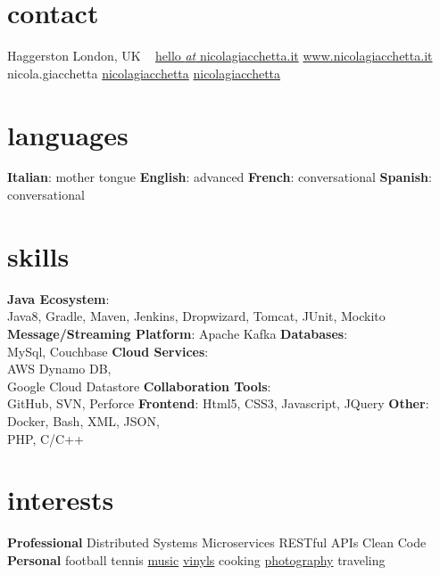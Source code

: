 
\newcommand*{\img}[1]{%
    \raisebox{-.1\baselineskip}{%
        \texttt{[image: \#1]}%
    }%
}



\begin{aside} %
\section{\normalfont contact}
\img{img_tube.png} Haggerston
London, UK
~
\myNumberUK
\href{mailto:\myEmail}{hello {\emph{at}} nicolagiacchetta.it}
\href{http://www.nicolagiacchetta.it/}{www.nicolagiacchetta.it}
\raisebox{-0.4ex}{\skype{}} nicola.giacchetta
 \hspace{0.02cm} \href{https://github.com/nicolagiacchetta}{ nicolagiacchetta}
 \hspace{0.02cm} \href{https://www.linkedin.com/in/nicolagiacchetta}{ nicolagiacchetta}
~
\vspace{-0.1cm}
\section{\normalfont languages}
\textbf{Italian}: mother tongue
\textbf{English}: advanced
\textbf{French}: conversational
\textbf{Spanish}: conversational
~
\vspace{-0.1cm}
\section{\normalfont skills}
\textbf{Java Ecosystem}:\\ Java8, Gradle, Maven, Jenkins, Dropwizard, Tomcat, JUnit, Mockito
\textbf{Message/Streaming Platform}: Apache Kafka
\textbf{Databases}:\\ MySql, Couchbase
\textbf{Cloud Services}:\\ AWS Dynamo DB,\\ Google Cloud Datastore
\textbf{Collaboration Tools}:\\ GitHub, SVN, Perforce 
\textbf{Frontend}: Html5, CSS3, Javascript, JQuery
\textbf{Other}: Docker, Bash, XML, JSON,\\ PHP, C/C++ 
~
\vspace{-0.1cm}
\section{\normalfont interests}
\textbf{Professional}
Distributed Systems
Microservices
RESTful APIs
Clean Code
~
\vspace{-0.1cm}
\textbf{Personal}
football
tennis
\href{https://open.spotify.com/user/1171479957}{music}
\href{https://www.discogs.com/user/little_jacket/collection}{vinyls}
cooking
\href{https://www.flickr.com/photos/nicolagiacchetta}{photography}
traveling
~
\end{aside}

